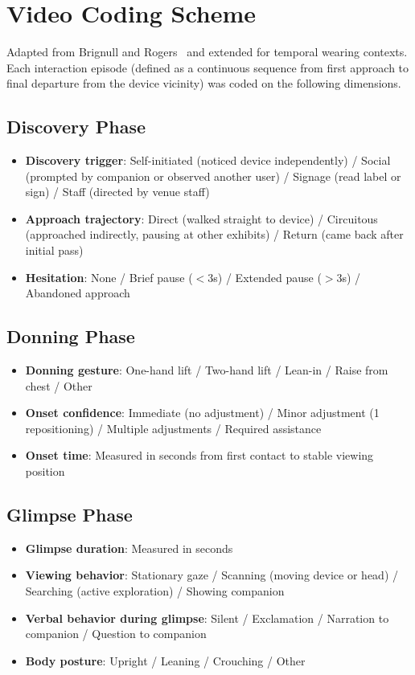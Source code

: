 \section{Video Coding Scheme}
\label{appendix:coding}

Adapted from Brignull and Rogers~\cite{brignull2003enticing} and extended for temporal wearing contexts. Each interaction episode (defined as a continuous sequence from first approach to final departure from the device vicinity) was coded on the following dimensions.

\subsection{Discovery Phase}
\begin{itemize}
    \item \textbf{Discovery trigger}: Self-initiated (noticed device independently) / Social (prompted by companion or observed another user) / Signage (read label or sign) / Staff (directed by venue staff)
    \item \textbf{Approach trajectory}: Direct (walked straight to device) / Circuitous (approached indirectly, pausing at other exhibits) / Return (came back after initial pass)
    \item \textbf{Hesitation}: None / Brief pause ($<$3s) / Extended pause ($>$3s) / Abandoned approach
\end{itemize}

\subsection{Donning Phase}
\begin{itemize}
    \item \textbf{Donning gesture}: One-hand lift / Two-hand lift / Lean-in / Raise from chest / Other
    \item \textbf{Onset confidence}: Immediate (no adjustment) / Minor adjustment (1 repositioning) / Multiple adjustments / Required assistance
    \item \textbf{Onset time}: Measured in seconds from first contact to stable viewing position
\end{itemize}

\subsection{Glimpse Phase}
\begin{itemize}
    \item \textbf{Glimpse duration}: Measured in seconds
    \item \textbf{Viewing behavior}: Stationary gaze / Scanning (moving device or head) / Searching (active exploration) / Showing companion
    \item \textbf{Verbal behavior during glimpse}: Silent / Exclamation / Narration to companion / Question to companion
    \item \textbf{Body posture}: Upright / Leaning / Crouching / Other
\end{itemize}

